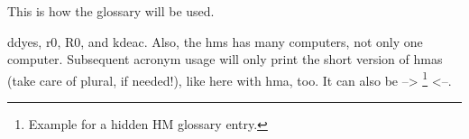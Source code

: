 This is how the glossary will be used.

\Glspl{ddye}, \gls{r0}, \gls{R0}, and \gls{kdeac}. Also, the \glspl{hm} has many \glspl{computer}, not only one \Gls{computer}. Subsequent acronym usage will only print the short version of \glspl{hma} (take care of plural, if needed!), like here with \gls{hma}, too. It can also be --> \footnote{Example for a hidden HM glossary entry.} <--.


